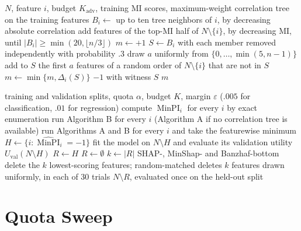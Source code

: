 \documentclass{article}
\begin{document}
\begin{algorithm}[htbp]
\caption{MI-correlation-guided perturbation for feature $i$ (Algorithm B)}
\label{alg:b}
\begin{algorithmic}[1]
\Require $N$, feature $i$, budget $K_{\mathrm{adv}}$, training MI scores, maximum-weight correlation tree on the training features
\State $B_i\gets$ up to ten tree neighbors of $i$, by decreasing absolute correlation
\State add features of the top-MI half of $N\setminus\{i\}$, by decreasing MI, until $|B_i|\geq\min(20,\lfloor n/3\rfloor)$
\State $m\gets+1$
\State $S\gets B_i$ with each member removed independently with probability $.3$
\State draw $a$ uniformly from $\{0,\ldots,\min(5,n-1)\}$
\State add to $S$ the first $a$ features of a random order of $N\setminus\{i\}$ that are not in $S$
\State $m\gets\min\{m,\Delta_i(S)\}$
 \Return $-1$ with witness $S$ \EndIf
\EndFor
\State \Return $m$
\end{algorithmic}
\end{algorithm}

\begin{algorithm}[htbp]
\caption{Hybrid dispatcher, validation gate, and matched controls}
\label{alg:removal}
\begin{algorithmic}[1]
\Require training and validation splits, quota $\alpha$, budget $K$, margin $\varepsilon$ ($.005$ for classification, $.01$ for regression)
\State compute $\operatorname{MinPI}_i$ for every $i$ by exact enumeration
\State run Algorithm B for every $i$ (Algorithm A if no correlation tree is available)
\Else
\State run Algorithms A and B for every $i$ and take the featurewise minimum
\EndIf
\State $H\gets\{i:\widehat{\operatorname{MinPI}}_i=-1\}$
\State fit the model on $N\setminus H$ and evaluate its validation utility $U_{\mathrm{val}}(N\setminus H)$
\State $R\gets H$
\Else
\State $R\gets\emptyset$ 
\EndIf
\State $k\gets|R|$
\State SHAP-, MinShap- and Banzhaf-bottom delete the $k$ lowest-scoring features; random-matched deletes $k$ features drawn uniformly, in each of 30 trials
\State \Return $N\setminus R$, evaluated once on the held-out split
\end{algorithmic}
\end{algorithm}

\FloatBarrier
\section{Quota Sweep}
\end{document}
